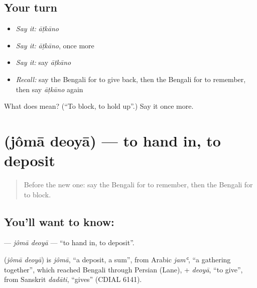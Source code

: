 \subsection*{Your turn}
\begin{itemize}
\raggedright
  \item \emph{Say it:} \emph{āṭkāno}
  \item \emph{Say it:} \emph{āṭkāno}, once more
  \item \emph{Say it:} say \emph{āṭkāno}
  \item \emph{Recall:} say the Bengali for to give back, then the Bengali for to remember, then say \emph{āṭkāno} again
\end{itemize}

\begin{tcolorbox}[breakable,colback=teal!4,colframe=teal!35!black,title={Before you move on}]
What does  mean? (\textquotedblleft{}To block, to hold up\textquotedblright{}.) Say it once more.
\end{tcolorbox}
\section[\texorpdfstring{\bn{জমা} \bn{দেওয়া} (jômā deoyā)}{জমা দেওয়া (jômā deoyā)}]{  (jômā deoyā) — to hand in, to deposit}

\label{lesson:BN-C240-joma-deoya}



\begin{quote}
Before the new one: say the Bengali for to remember, then the Bengali for to block.
\end{quote}

\subsection*{You'll want to know:  }
\textbf{ } — \emph{jômā deoyā} — \textquotedblleft{}to hand in, to deposit\textquotedblright{}.

\begin{cousinweb}
\textbf{ } (\emph{jômā deoyā}) is \emph{jômā}, \textquotedblleft{}a deposit, a sum\textquotedblright{}, from Arabic \emph{jamʿ}, \textquotedblleft{}a gathering together\textquotedblright{}, which reached Bengali through Persian (Lane), + \emph{deoyā}, \textquotedblleft{}to give\textquotedblright{}, from Sanskrit \emph{dadāti}, \textquotedblleft{}gives\textquotedblright{} (CDIAL 6141).
\end{cousinweb}

